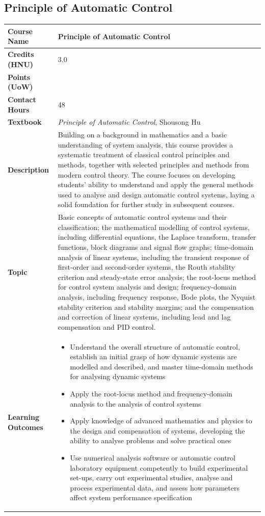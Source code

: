 \documentclass{article}
\begin{document}
\subsection{Principle of Automatic Control}
\renewcommand{\arraystretch}{1.5} %
\begin{longtable}{|p{3cm}|p{10cm}|}
\hline
\textbf{Course Name} & Principle of Automatic Control \\
\hline
\textbf{Credits (HNU)} & 3.0 \\
\hline
\textbf{Points (UoW)} & \\
\hline
\textbf{Contact Hours} & 48 \\
\hline
\textbf{Textbook} & \emph{Principle of Automatic Control}, Shousong Hu \\
\hline
\textbf{Description} & Building on a background in mathematics and a basic understanding of system analysis, this course provides a systematic treatment
  of classical control principles and methods, together with selected principles and methods from modern control theory. The course
  focuses on developing students' ability to understand and apply the general methods used to analyse and design automatic control
  systems, laying a solid foundation for further study in subsequent courses. \\
\hline
\textbf{Topic} & Basic concepts of automatic control systems and their classification; the mathematical modelling of control systems, including differential equations, the Laplace transform, transfer functions, block diagrams and signal flow graphs; time-domain analysis of linear systems, including the transient response of first-order and second-order systems, the Routh stability criterion and steady-state error analysis; the root-locus method for control system analysis and design; frequency-domain analysis, including frequency response, Bode plots, the Nyquist stability criterion and stability margins; and the compensation and correction of linear systems, including lead and lag compensation and PID control. \\
\hline
\textbf{Learning Outcomes} & 
    \begin{itemize}
        \item Understand the overall structure of automatic control, establish an initial grasp of how dynamic systems are modelled and described, and master time-domain methods for analysing dynamic systems
        \item Apply the root-locus method and frequency-domain analysis to the analysis of control systems
        \item Apply knowledge of advanced mathematics and physics to the design and compensation of systems, developing the ability to analyse problems and solve practical ones
        \item Use numerical analysis software or automatic control laboratory equipment competently to build experimental set-ups, carry out experimental studies, analyse and process experimental data, and assess how parameters affect system performance specification
    \end{itemize} \\
\hline
\end{longtable}

\clearpage
\end{document}
